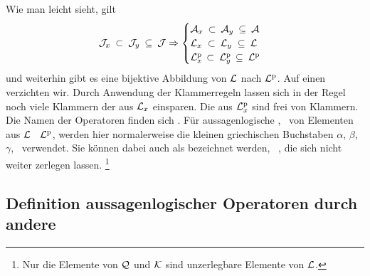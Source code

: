 Wie man leicht sieht, gilt
\begin{equation}
	\mathcal{J}_x      \: \subset \: \mathcal{J}_y  \: \subseteq \: \mathcal{J} \Rightarrow
	\begin{cases}
		\mathcal{A}_x  \: \subset \: \mathcal{A}_y  \: \subseteq \: \mathcal{A} \\
		\mathcal{L}_x  \; \subset \: \mathcal{L}_y  \; \subseteq \: \mathcal{L} \\
		\mathcal{L}^\mathrm{p}_x \, \subset \: \mathcal{L}^\mathrm{p}_y \, \subseteq \: \mathcal{L}^\mathrm{p}
	\end{cases}
\end{equation}
und weiterhin gibt es eine bijektive Abbildung von $\mathcal{L}$ nach $\mathcal{L}^\mathrm{p}$. Auf einen  verzichten wir.
%
Durch Anwendung der Klammerregeln  lassen sich in der Regel noch viele Klammern der  aus $\mathcal{L}_x$ einsparen.
Die  aus $\mathcal{L}^\mathrm{p}_x$ sind frei von Klammern.
Die Namen der Operatoren finden sich .
Für aussagenlogische , \textdh\ von Elementen aus $\mathcal{L}$ \textbzgl\ $\mathcal{L}^\mathrm{p}$, werden hier normalerweise die kleinen griechischen Buchstaben $\alpha$, $\beta$, $\gamma$, \textusw\ verwendet.
Sie können dabei auch als \emph{} bezeichnet werden, \textdh\ , die sich nicht weiter zerlegen lassen.%
\footnote{%
	Nur die Elemente von $\mathcal{Q}$ und $\mathcal{K}$ sind unzerlegbare Elemente von $\mathcal{L}$.
}

\subsection{Definition aussagenlogischer Operatoren durch andere}%
\label{sub:ausOperatorDef}

